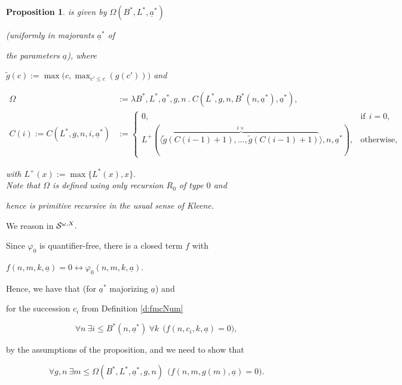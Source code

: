 \documentclass[1p]{elsarticle}
\newcommand{\Tif}{\text{if}\ }
\newcommand{\Telse}{\text{otherwise}}
\theoremstyle{plain}
\newtheorem{prop}[thm]{Proposition}
\theoremstyle{definition}
\theoremstyle{remark}
\renewenvironment{proof}[1][]{\noindent{\bf Proof{#1}. }}{\nopagebreak[4]{\hspace*{\fill}


  $\Box$              %

 }{\vspace{2ex}}}
\renewcommand{\phi}{\varphi}
\theoremstyle{definition}
\begin{document}
{\begin{prop}
is given by $\Omega(B^*,L^*,\underline{a}^*)$ 

(uniformly in majorants $\underline{a}^*$ of 

the parameters $\underline{a}$), where 

$\tilde g(c):=\max\big(c,\max_{c'\leq c}(g(c'))\big)$ and

\begin{align*} 

  \Omega&:=\lambda B^*,L^*,\underline{a}^*,g,n\ .\ C(L^*,g,n,

B^*(n,\underline{a}^*),\underline{a}^*),\\

C(i):=C(L^*,g,n,i,\underline{a}^*)&:=

\begin{cases}0,&\Tif\ i=0,\\ L^+(\langle\overbrace{ \tilde g(C(i-1)+1),\ldots,\tilde g(C(i-1)+1) }^{i\times}\rangle,n,\underline{a}^*),&\Telse,\end{cases}

\end{align*}

with $L^+(x):=\max\{ L^*(x),x\}.$ \\ 

Note that $\Omega$ is defined using only recursion $R_0$ of type $0$ and 

hence is primitive recursive in the usual sense of Kleene.

\end{prop}

\begin{proof} We reason in ${\cal S}^{\omega,X}.$

Since $\phi_0$ is quantifier-free, there is a closed term $f$ with 

$f(n,m,k,\underline{a})=0\leftrightarrow \phi_0(n,m,k,\underline{a})$. 

Hence, we have that (for $\underline{a}^*$ majorizing $\underline{a}$) and 

for the succession $c_i$ from Definition \ref{d:fmcNum} 

\[ \forall n\ \exists i\leq B^*(n,\underline{a}^*)\ \forall k\ \ \big( 

f(n,c_i,k,\underline{a})=0 \big), \]

by the assumptions of the proposition, and we need to show that

\[ \forall g,n\ \exists m\leq \Omega(B^*,L^*,\underline{a}^*,g,n) 

\ \ \big( f(n,m,g(m),\underline{a})=0 \big). \]


\end{proof}}
\end{document}
